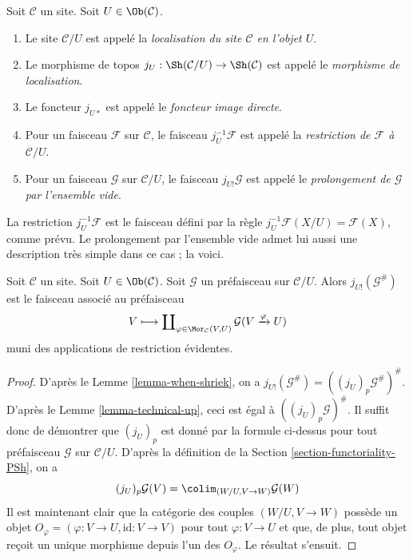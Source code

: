 \begin{definition}
\label{definition-localize}
Soit $\mathcal{C}$ un site.
Soit $U \in \Ob(\mathcal{C})$.
\begin{enumerate}
\item Le site $\mathcal{C}/U$ est appelé la {\it localisation du site
$\mathcal{C}$ en l’objet $U$}.
\item Le morphisme de topos
$j_U : \Sh(\mathcal{C}/U) \to \Sh(\mathcal{C})$
est appelé le {\it morphisme de localisation}.
\item Le foncteur $j_{U*}$ est appelé le {\it foncteur image directe}.
\item Pour un faisceau $\mathcal{F}$ sur $\mathcal{C}$, le faisceau
$j_U^{-1}\mathcal{F}$ est appelé la {\it restriction de $\mathcal{F}$
à $\mathcal{C}/U$}.
\item Pour un faisceau $\mathcal{G}$ sur $\mathcal{C}/U$, le faisceau
$j_{U!}\mathcal{G}$ est appelé le
{\it prolongement de $\mathcal{G}$ par l’ensemble vide}.
\end{enumerate}
\end{definition}

\noindent
La restriction $j_U^{-1}\mathcal{F}$ est le faisceau défini par la règle
$j_U^{-1}\mathcal{F}(X/U) = \mathcal{F}(X)$, comme prévu.
Le prolongement par l’ensemble vide admet lui aussi une description très simple
dans ce cas ; la voici.

\begin{lemma}
\label{lemma-describe-j-shriek}
Soit $\mathcal{C}$ un site.
Soit $U \in \Ob(\mathcal{C})$.
Soit $\mathcal{G}$ un préfaisceau sur $\mathcal{C}/U$.
Alors $j_{U!}(\mathcal{G}^\#)$ est le faisceau associé au préfaisceau
$$
V
\longmapsto
\coprod\nolimits_{\varphi \in \Mor_\mathcal{C}(V, U)}
\mathcal{G}(V \xrightarrow{\varphi} U)
$$
muni des applications de restriction évidentes.
\end{lemma}

\begin{proof}
D’après le Lemme \ref{lemma-when-shriek}, on a
$j_{U!}(\mathcal{G}^\#) = ((j_U)_p\mathcal{G}^\#)^\#$.
D’après le Lemme \ref{lemma-technical-up}, ceci est égal à
$((j_U)_p\mathcal{G})^\#$.
Il suffit donc de démontrer que $(j_U)_p$ est donné par la formule ci-dessus
pour tout préfaisceau $\mathcal{G}$ sur $\mathcal{C}/U$.
D’après la définition de la
Section \ref{section-functoriality-PSh}, on a
$$
(j_U)_p\mathcal{G}(V)
=
\colim_{(W/U, V \to W)} \mathcal{G}(W)
$$
Il est maintenant clair que la catégorie des couples $(W/U, V \to W)$
possède un objet $O_\varphi = (\varphi : V \to U, \text{id} : V \to V)$
pour tout $\varphi : V \to U$ et que, de plus, tout objet reçoit un unique
morphisme depuis l’un des $O_\varphi$. Le résultat s’ensuit.
\end{proof}

